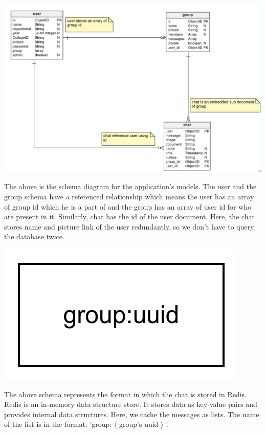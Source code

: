 \documentclass{scrreprt}
\begin{document}
\begin{center}
\includegraphics[scale=.4]{classdiagram}
\end{center}

The above is the schema diagram for the application's models. The user and the
group schema have a referenced relationship which means the user has an array of
group id which he is a part of and the group has an array of user id for who are
present in it. Similarly, chat has the id of the user document. Here, the chat
stores name and picture link of the user redundantly, so we don't have to query
the database twice.

\begin{center}
\includegraphics[scale=.4]{rediser}
\end{center}

The above schema represents the format in which the chat is stored in Redis.
Redis is an in-memory data structure store. It stores data as key-value pairs
and provides internal data structures. Here, we cache the messages as lists. The
name of the list is in the format: 'group: $\langle$ group's uuid $\rangle$ '.
\end{document}
